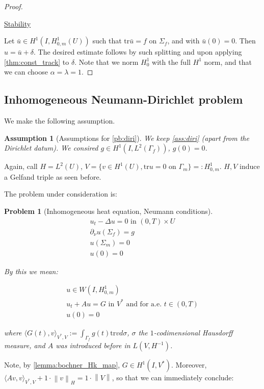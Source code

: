 \documentclass[english,a4paper,9pt,oneside]{scrbook}	%
\theoremstyle{break}
\newtheorem{ass}[equation]{Assumption}
\newtheorem{pb}[equation]{Problem}
\newenvironment{mproof}[1][\proofname]{%
  \begin{proof}[#1]$ $\par\nobreak\ignorespaces
}{%
  \end{proof}
}
\renewcommand*{\proofname}{Proof}
\theoremstyle{remark}
\newcommand{\norm}[1]{\left\lVert#1\right\rVert}
\newcommand{\HN}[1]{\norm{#1}_{H}}
\newcommand{\tr}{\text{tr}}
\begin{document}
\begin{appendices}
\begin{mproof}
\underline{Stability}

Let $\bar{u}\in H^1(I,H^1_{0,m}(U))$ such that $\tr \bar{u} =f$ on $\Sigma_f$, and with $\bar{u}(0)=0$. Then $u=\bar{u}+\delta$. The desired estimate follows by such splitting and upon applying \cref{thm:const_track} to $\delta$. Note that we norm $H^1_0$ with the full $H^1$ norm, and that we can choose $\alpha = \lambda = 1$.
\end{mproof}

\subsection{Inhomogeneous Neumann-Dirichlet problem}

We make the following assumption.

\begin{ass}[Assumptions for \cref{pb:diri}]
\label{ass:neu}
We keep \cref{ass:diri} (apart from the Dirichlet datum). We consired $g \in H^1(I, L^2(\Gamma_f))$, $g(0)=0$.
\end{ass}

Again, call $H=L^2(U)$, $V=\{ v \in H^1(U), \tr u = 0 \text{ on } \Gamma_m\}=:H^1_{0,m}$. $H,V$ induce a Gelfand triple as seen before. 


The problem under consideration is:

\begin{pb}[Inhomogeneous heat equation, Neumann conditions]
\label{pb:neu}
\begin{align}
u_t - \Delta u = 0 \text{ in } (0,T)\times U\\
\partial_\nu u(\Sigma_f)=g\\
u(\Sigma_m)=0\\
u(0)=0
\end{align}

By this we mean:

\begin{align}
u \in W(I,H^1_{0,m}) \\
u_t + A u = G \text{ in } V^* \text{ and for a.e. } t \in (0,T) \\
u(0)=0
\end{align}

where $\langle G(t), v \rangle_{V^*,V}:=\int_{\Gamma_f} g(t)\tr v d\sigma$, $\sigma$ the $1$-codimensional Hausdorff measure, and $A$ was introduced before in $L(V,H^{-1})$.

\end{pb}

Note, by \cref{lemma:bochner_Hk_map}, $G \in H^1(I,V^*)$. Moreover, $\langle A v, v \rangle_{V^*,V}+ 1 \cdot \HN{v} = 1\cdot \norm{V}$, so that we can immediately conclude:


\end{appendices}
\end{document}
